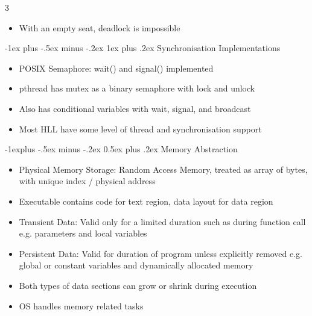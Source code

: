 \documentclass[10pt, landscape]{article}
\makeatletter
\renewcommand{\section}{\@startsection{section}{1}{0mm}%
                                {-1ex plus -.5ex minus -.2ex}%
                                {0.5ex plus .2ex}%
                                {\normalfont\large\bfseries}}
\renewcommand{\section}{\@startsection{section}{2}{0mm}%
                                {-1explus -.5ex minus -.2ex}%
                                {0.5ex plus .2ex}%
                                {\normalfont\normalsize\bfseries}}
\renewcommand{\subsection}{\@startsection{subsection}{3}{0mm}%
                                {-1ex plus -.5ex minus -.2ex}%
                                {1ex plus .2ex}%
                                {\normalfont\small\bfseries}}%
\makeatother
\begin{document}
\begin{multicols*}{3}
\begin{itemize}
\begin{itemize}
\begin{verbatim}
            wait(s[i]);
        }
        void safeToEat(i) {
            if (state[i] == HUNGRY &&
                state[LEFT] != EATING &&
                state[RIGHT] != EATING) {
                state[i] = EATING;
                signal(s[i]);
            }
        }
        void putChpStcks(i) {
            wait(mutex);
            state[i] = THINKING;
            safeToEat(LEFT);
            safeToEat(RIGHT);
            signal(mutex);
        }
        \end{verbatim}
        \item With an empty seat, deadlock is impossible
    \end{itemize}
\end{itemize}

\subsection{Synchronisation Implementations}
\begin{itemize}
    \item POSIX Semaphore: wait() and signal() implemented
    \item pthread has mutex as a binary semaphore with lock and unlock
    \item Also has conditional variables with wait, signal, and broadcast
    \item Most HLL have some level of thread and synchronisation support
\end{itemize}

\section{Memory Abstraction}
\begin{itemize}
    \item Physical Memory Storage: Random Access Memory, treated as array of bytes, with unique index / physical address
    \item Executable contains code for text region, data layout for data region
    \item Transient Data: Valid only for a limited duration such as during function call e.g. parameters and local variables
    \item Persistent Data: Valid for duration of program unless explicitly removed e.g. global or constant variables and dynamically allocated memory
    \item Both types of data sections can grow or shrink during execution
    \item OS handles memory related tasks
\end{itemize}


\end{multicols*}
\end{document}
